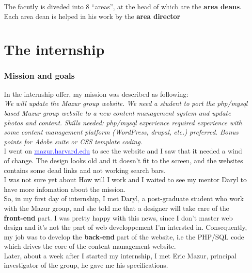 \documentclass[10pt,a4paper]{article}
\begin{document}
The facutly is diveded into 8 ``areas'', at the head of which are the \textbf{area deans}.\\
Each area dean is helped in his work by the \textbf{area director}


\newpage
\part{The internship}

\section{Mission and goals}
In the internship offer, my mission was described as following:\\

\textit{We will update the Mazur group website. We need a student to port the php/mysql based Mazur group website to a new content management system and update photos and content.
Skills needed:
php/mysql experience required
experience with some content management platform (WordPress, drupal, etc.) preferred. Bonus points for Adobe suite or CSS template coding.}\\

I went on \textcolor{blue}{\underline{mazur.harvard.edu}} to see the website and I saw that it needed a wind of change. The design looks old and it doesn't fit to the screen, and the websites contains some dead links and not working search bars.\\
I was not sure yet about How will I work and I waited to see my mentor Daryl to have more infomation about the mission.\\

So, in my first day of internship, I met Daryl, a post-graduate student who work with the Mazur group, and she told me that a designer will take care of the \textbf{front-end } part. I was pretty happy with this news, since I don't master web design and it's not the part of web developpement I'm intersted in. Consequently, my job was to develop the \textbf{back-end} part of the website, i.e the PHP/SQL code which drives the core of the content management website. \\
Later, about a week after I started my internship, I met Eric Mazur, principal investigator of the group, he gave me his specifications.
\end{document}
